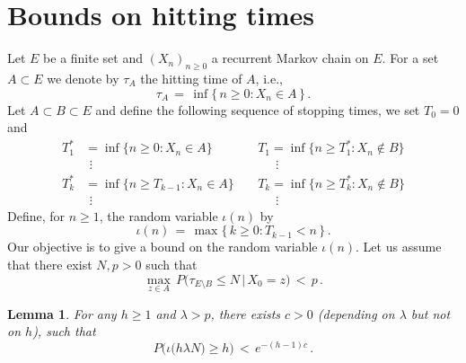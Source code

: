 \documentclass[a4paper,12pt]{article}
\newtheorem{lemma}[theorem]{Lemma}
\theoremstyle{definition}
\theoremstyle{remark}
\def \l {\lambda}
\begin{document}
\section{Bounds on hitting times}
Let $E$ be a finite set and $(X_n)_{n\geq 0}$ a recurrent Markov chain on $E$.
For a set $A\subset E$ we denote by $\tau_A$ the hitting time of $A$,
i.e.,
$$\tau_A\,=\,\inf\big\lbrace\,n\geq 0:X_n\in A\,\big\rbrace\,.$$
Let $A\subset B\subset E$ and
define the following sequence of stopping times, 
we set $T_0=0$ and 
\begin{align*}
T^*_1&=\inf\big\lbrace
n\geq0:
X_n\in A
\big\rbrace\qquad
&&T_1=\inf\big\lbrace
n\geq T^*_1:
X_n\not\in B
\big\rbrace\\
&\ \, \vdots &&\ \ \quad\vdots\\
T^*_k&=\inf\big\lbrace
n\geq T_{k-1}:
X_n\in A
\big\rbrace\ 
&&T_k=\inf\big\lbrace
n\geq T^*_k:
X_n\not\in B
\big\rbrace\\
&\ \, \vdots &&\ \ \quad\vdots
\end{align*}
Define, for $n\geq1$, the random variable $\iota(n)$ by 
$$\iota(n)\,=\,\max\big\lbrace\,  
k\geq0 : T_{k-1}< n
\,\big\rbrace\,.$$
Our objective is to give a bound 
on the random variable $\iota(n)$.
Let us assume that there exist $N,p>0$ such that
$$\max_{z\in A}\,P\big(
\tau_{E\setminus B}\leq N\,\big|\, X_0=z
\big)\,<\,p\,.$$
\begin{lemma}\label{nbhits}
For any $h\geq 1$ and $\l> p$,
there exists $c>0$ (depending on $\l$ but not on $h$), such that
$$P\Big(
\iota\big(h\l N \big)\geq h
\Big)\,<\,e^{-(h-1)c}\,.
$$
\end{lemma}
\end{document}
